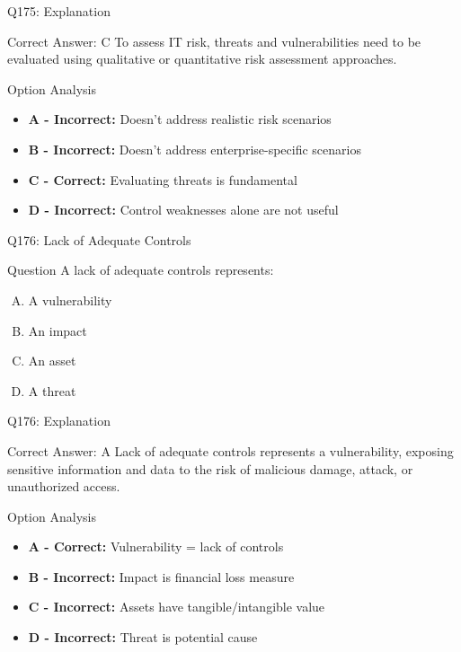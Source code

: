 \documentclass{beamer}
\begin{document}
	\begin{frame}{Q175: Explanation}
		\begin{block}{Correct Answer: C}
			To assess IT risk, threats and vulnerabilities need to be evaluated using qualitative or quantitative risk assessment approaches.
		\end{block}
		\begin{block}{Option Analysis}
			\begin{itemize}
				\item \textbf{A - Incorrect:} Doesn't address realistic risk scenarios
				\item \textbf{B - Incorrect:} Doesn't address enterprise-specific scenarios
				\item \textbf{C - Correct:} Evaluating threats is fundamental
				\item \textbf{D - Incorrect:} Control weaknesses alone are not useful
			\end{itemize}
		\end{block}
	\end{frame}
	
	\begin{frame}{Q176: Lack of Adequate Controls}
		\begin{block}{Question}
			A lack of adequate controls represents:
		\end{block}
		\begin{enumerate}[(A)]
			\item A vulnerability
			\item An impact
			\item An asset
			\item A threat
		\end{enumerate}
	\end{frame}
	
	\begin{frame}{Q176: Explanation}
		\begin{block}{Correct Answer: A}
			Lack of adequate controls represents a vulnerability, exposing sensitive information and data to the risk of malicious damage, attack, or unauthorized access.
		\end{block}
		\begin{block}{Option Analysis}
			\begin{itemize}
				\item \textbf{A - Correct:} Vulnerability = lack of controls
				\item \textbf{B - Incorrect:} Impact is financial loss measure
				\item \textbf{C - Incorrect:} Assets have tangible/intangible value
				\item \textbf{D - Incorrect:} Threat is potential cause
			\end{itemize}
		\end{block}
	\end{frame}
	
\end{document}
